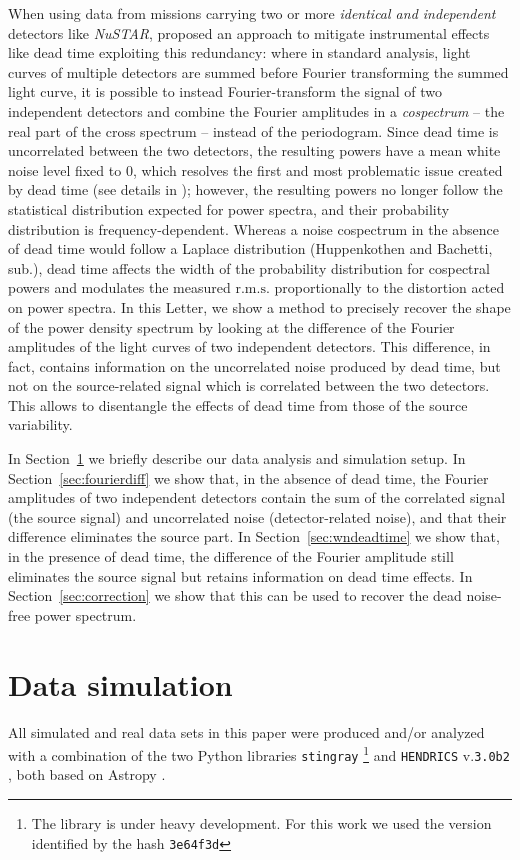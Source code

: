 \documentclass[twocolumn]{aastex61}
\newcommand{\project}[1]{\textsl{#1}}
\newcommand{\nustar}{\project{NuSTAR}\xspace}
\newcommand{\sref}{Section~\ref}
\newcommand{\rms}{\ensuremath{\mathrm{r.m.s.}}\xspace}
\begin{document}
When using data from missions carrying two or more \textit{identical and independent} detectors like \nustar, \citet{Bachetti+15} proposed an approach to mitigate instrumental effects like dead time exploiting this redundancy: 
where in standard analysis, light curves of multiple detectors are summed before Fourier transforming the summed light curve, 
it is possible to instead Fourier-transform the signal of two independent detectors and combine the Fourier amplitudes in a \textit{cospectrum} -- the real part of the cross spectrum -- instead of the periodogram. 
Since dead time is uncorrelated between the two detectors, the resulting powers have a mean white noise level fixed to 0, which resolves the first and most problematic issue created by dead time (see details in \citealt{Bachetti+15}); however, the resulting powers no longer follow the statistical distribution expected for power spectra, and their probability distribution is frequency-dependent.
Whereas a noise cospectrum in the absence of dead time would follow a Laplace distribution (Huppenkothen and Bachetti, sub.),
dead time affects the width of the probability distribution for cospectral powers and modulates the measured \rms proportionally to the distortion acted on power spectra.
In this Letter, we show a method to precisely recover the shape of the power density spectrum by looking at the difference of the Fourier amplitudes of the light curves of two independent detectors.
This difference, in fact, contains information on the uncorrelated noise produced by dead time, but not on the source-related  signal which is correlated between the two detectors.
This allows to disentangle the effects of dead time from those of the source variability.

In \sref{sec:data} we briefly describe our data analysis and simulation setup.
In \sref{sec:fourierdiff} we show that, in the absence of dead time, the Fourier amplitudes of two independent detectors contain the sum of the correlated signal (the source signal) and uncorrelated noise (detector-related noise), and that their difference eliminates the source part. 
In \sref{sec:wndeadtime} we show that, in the presence of dead time, the difference of the Fourier amplitude still eliminates the source signal but retains information on dead time effects.
In \sref{sec:correction} we show that this can be used to recover the dead noise-free power spectrum.


\section{Data simulation} \label{sec:data}
All simulated and real data sets in this paper were produced and/or analyzed with a combination of the two Python libraries \texttt{stingray}%
\footnote{The library is under heavy development.
    For this work we used the version identified by the hash \texttt{3e64f3d}}
\citep{huppenkothen2016} and \texttt{HENDRICS} v.\texttt{3.0b2} \citep[formerly known as MaLTPyNT;][]{2015ascl.soft02021B}, both based on Astropy \citep{astropy2013}.
\end{document}
